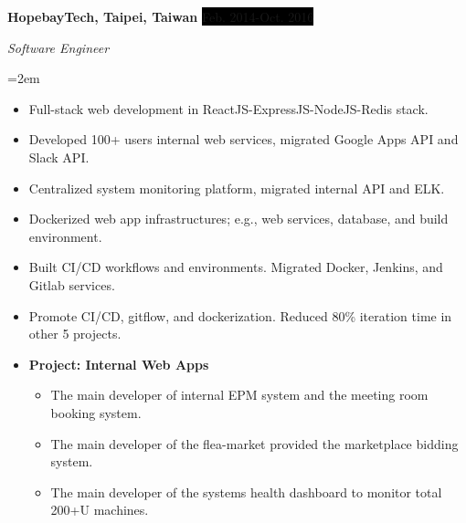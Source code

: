 \documentclass[a4paper, 11pt]{article}
\newcommand{\sepspace}{\vspace*{1em}}		%
\newcommand{\NewPart}[1]{\section*{\uppercase{#1}}}
\newcommand{\EducationEntry}[4]{
		\noindent \textbf{#1} \hfill      %
		\colorbox{White}{%
			\parbox{5cm}{%
			\hfill\color{Black}#2}} \par  %
		\noindent \textit{#3} \par        %
		\noindent\hangindent=2em\hangafter=0 \small #4 %
		\normalsize \par}
\newcommand{\WorkEntry}[4]{				  %
		\noindent \textbf{#1} \hfill      %
		\noindent\colorbox{Black}{\color{White}#2} \par  %
		\noindent \textit{#3} \par              %
		\noindent\hangindent=2em\hangafter=0 \small #4 %
		\normalsize \par}
\begin{document}
\sepspace

\WorkEntry{HopebayTech, Taipei, Taiwan}{Feb. 2014-Oct. 2016}{Software Engineer}{
\begin{itemize}
	\item {Full-stack web development in ReactJS-ExpressJS-NodeJS-Redis stack.}
	\item {Developed 100+ users internal web services, migrated Google Apps API and Slack API.}
	\item {Centralized system monitoring platform, migrated internal API and ELK.}
	\item {Dockerized web app infrastructures; e.g., web services, database, and build environment.}
	\item {Built CI/CD workflows and environments. Migrated Docker, Jenkins, and Gitlab services.}
	\item {Promote CI/CD, gitflow, and dockerization. Reduced 80\% iteration time in other 5 projects.}
	\item []{
		\textbf{Project: Internal Web Apps}
		\begin{itemize}
			\item {The main developer of internal EPM system and the meeting room booking system.}
			\item {The main developer of the flea-market provided the marketplace bidding system.}
			\item {The main developer of the systems health dashboard to monitor total 200+U machines.}
		\end{itemize}
	}
\end{itemize}
}


\end{document}
